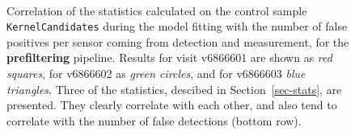 \documentclass[prd, nofootinbib, floatfix, 11pt,tightenlines,times]{article}
\begin{document}
\begin{figure}
 \\
\caption{Correlation of the statistics calculated on the control
  sample {\tt KernelCandidates} during the model fitting with the
  number of false positives per sensor coming from detection and
  measurement, for the {\bf prefiltering} pipeline.  Results for visit
  v6866601 are shown as {\it red squares}, for v6866602 as {\it green
    circles}, and for v6866603 {\it blue triangles}.  Three of the
  statistics, descibed in Section~\ref{sec-stats}, are presented.
  They clearly correlate with each other, and also tend to correlate
  with the number of false detections (bottom row).}
\label{corrpre}
\end{figure}
\end{document}
